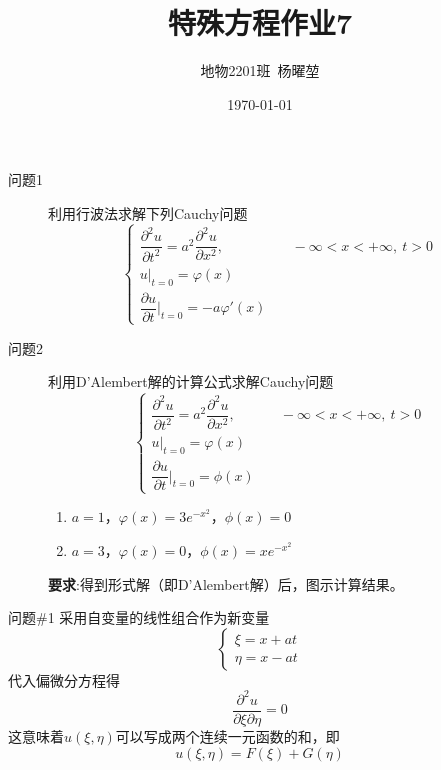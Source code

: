 \documentclass[12pt]{ctexart}
\title{特殊方程作业7}
\author{地物2201班\ 杨曜堃}
\date{\today}
\begin{document}
    \markboth{\theauthor}{\thetitle}
    \maketitle
    \begin{description}
        \item[问题1] 利用行波法求解下列Cauchy问题$$
        \begin{cases}
            \dfrac{\partial^2u}{\partial t^2}=a^2\dfrac{\partial^2u}{\partial x^2},&\quad -\infty<x<+\infty,\ t>0\\
            u|_{t=0}=\varphi(x)\\
            \dfrac{\partial u}{\partial t}|_{t=0}=-a\varphi'(x)
        \end{cases}
        $$ 
        \item[问题2] 利用D'Alembert解的计算公式求解Cauchy问题$$
        \begin{cases}
            \dfrac{\partial^2 u}{\partial t^2}=a^2\dfrac{\partial^2u}{\partial x^2},&\quad -\infty<x<+\infty,\ t>0\\
            u|_{t=0}=\varphi(x)\\
            \dfrac{\partial u}{\partial t}|_{t=0}=\phi(x)
        \end{cases}
        $$
        \begin{enumerate}
            \item $a=1$，$\varphi(x)=3e^{-x^2}$，$\phi(x)=0$
            \item $a=3$，$\varphi(x)=0$，$\phi(x)=xe^{-x^2}$
        \end{enumerate}
        \textbf{要求}:得到形式解（即D'Alembert解）后，图示计算结果。
    \end{description}
    \begin{problem}{问题\#1}
        采用自变量的线性组合作为新变量
        $$
        \begin{cases}
            \xi=x+at\\
            \eta=x-at
        \end{cases}
        $$
        代入偏微分方程得
        $$
        \dfrac{\partial^2u}{\partial\xi\partial\eta}=0
        $$
        这意味着$u(\xi,\eta)$可以写成两个连续一元函数的和，即
        $$
        u(\xi,\eta)=F(\xi)+G(\eta)
        $$   
    \end{problem}
\end{document}
